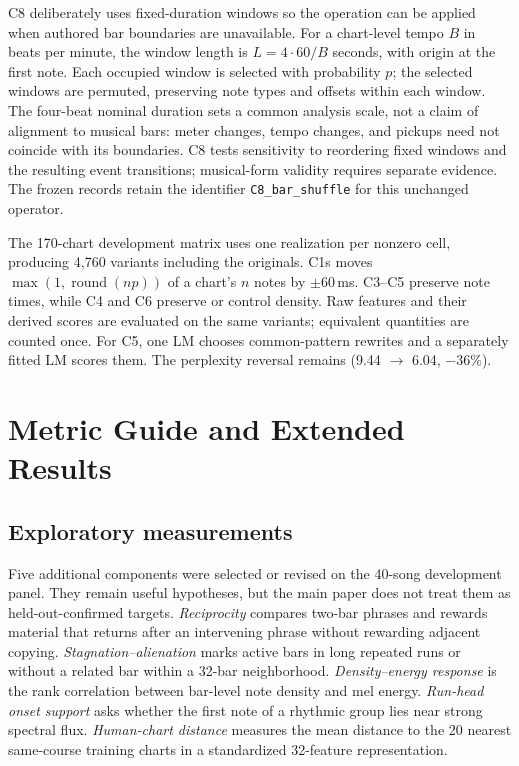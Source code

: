 \documentclass[10pt,twocolumn]{article}
\begin{document}
C8 deliberately uses fixed-duration windows so the operation can be applied
when authored bar boundaries are unavailable. For a chart-level tempo $B$
in beats per minute, the window length is $L=4\cdot60/B$ seconds, with origin
at the first note. Each occupied window is selected with probability $p$;
the selected windows are permuted, preserving note types and offsets within
each window. The four-beat nominal duration sets a common analysis scale,
not a claim of alignment to musical bars: meter changes, tempo changes, and
pickups need not coincide with its boundaries. C8 tests sensitivity to
reordering fixed windows and the resulting event transitions; musical-form
validity requires separate evidence. The frozen records retain the
identifier \texttt{C8\_bar\_shuffle} for this unchanged operator.

The 170-chart development matrix uses one realization per nonzero cell,
producing 4{,}760 variants including the originals. C1s moves
$\max(1,\operatorname{round}(np))$ of a chart's $n$ notes by
$\pm60$\,ms. C3--C5 preserve note times, while C4 and C6 preserve or
control density. Raw features and their derived scores are evaluated on
the same variants; equivalent quantities are counted once. For C5, one
LM chooses common-pattern rewrites and a separately fitted LM scores
them. The perplexity reversal remains (9.44 $\to$ 6.04, $-36\%$).

\FloatBarrier

\section{Metric Guide and Extended Results}\label{app:visuals}

\subsection{Exploratory measurements}

Five additional components were selected or revised on the 40-song
development panel. They remain useful hypotheses, but the main paper does not
treat them as held-out-confirmed targets. \emph{Reciprocity} compares two-bar
phrases and rewards material that returns after an intervening phrase without
rewarding adjacent copying. \emph{Stagnation--alienation} marks active bars in
long repeated runs or without a related bar within a 32-bar neighborhood.
\emph{Density--energy response} is the rank correlation between bar-level note
density and mel energy. \emph{Run-head onset support} asks whether the first
note of a rhythmic group lies near strong spectral flux. \emph{Human-chart
distance} measures the mean distance to the 20 nearest same-course training
charts in a standardized 32-feature representation.
\end{document}
